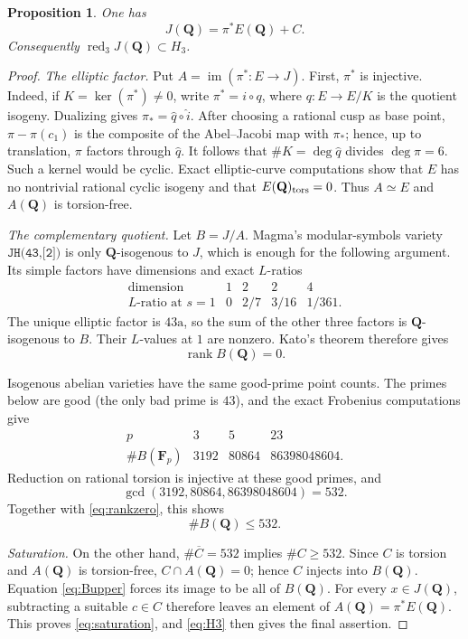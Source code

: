 \documentclass[11pt]{article}
\newcommand{\Q}{\mathbf Q}
\newcommand{\F}{\mathbf F}
\newcommand{\red}{\operatorname{red}}
\newcommand{\code}[1]{\texttt{#1}}
\newtheorem{proposition}[theorem]{Proposition}
\begin{document}
\begin{proposition}\label{prop:saturation}
One has
\[
                       J(\Q)=\pi^*E(\Q)+C.
\tag{2.5}\label{eq:saturation}
\]
Consequently \(\red_3J(\Q)\subset H_3\).
\end{proposition}

\begin{proof}
\noindent\emph{The elliptic factor.}
Put \(A=\operatorname{im}(\pi^*:E\to J)\).  First, \(\pi^*\) is
injective.  Indeed, if \(K=\ker(\pi^*)\neq0\), write
\(\pi^*=i\circ q\), where \(q:E\to E/K\) is the quotient isogeny.
Dualizing gives \(\pi_*=\widehat q\circ\widehat i\).  After choosing a
rational cusp as base point, \(\pi-\pi(c_1)\) is the composite of the
Abel--Jacobi map with \(\pi_*\); hence, up to translation, \(\pi\)
factors through \(\widehat q\).  It follows that
\(\#K=\deg\widehat q\) divides \(\deg\pi=6\).
Such a kernel would be cyclic.  Exact elliptic-curve computations show
that \(E\) has no nontrivial rational cyclic isogeny and that
\(E(\Q)_{\rm tors}=0\).  Thus \(A\simeq E\) and \(A(\Q)\) is
torsion-free.

\smallskip
\noindent\emph{The complementary quotient.}
Let \(B=J/A\).  Magma's modular-symbols variety
\(\code{JH(43,[2])}\) is only \(\Q\)-isogenous to \(J\), which is enough
for the following argument.  Its simple factors have dimensions and
exact \(L\)-ratios
\[
\begin{array}{c|rrrr}
\text{dimension}&1&2&2&4\\ \hline
L\text{-ratio at }s=1&0&2/7&3/16&1/361.
\end{array}
\tag{2.6}\label{eq:Lratios}
\]
The unique elliptic factor is \(43\mathrm a\), so the sum of the other
three factors is \(\Q\)-isogenous to \(B\).  Their \(L\)-values at \(1\)
are nonzero.  Kato's theorem \cite[Corollary 14.3]{Kato} therefore gives
\[
                         \operatorname{rank}B(\Q)=0.
\tag{2.7}\label{eq:rankzero}
\]

Isogenous abelian varieties have the same good-prime point counts.  The
primes below are good (the only bad prime is \(43\)), and the exact
Frobenius computations give
\[
\begin{array}{c|rrr}
p&3&5&23\\ \hline
\#B(\F_p)&3192&80864&86398048604.
\end{array}
\]
Reduction on rational torsion is injective at these good primes, and
\[
             \gcd(3192,80864,86398048604)=532.
\]
Together with \eqref{eq:rankzero}, this shows
\[
                         \#B(\Q)\leq532.
\tag{2.8}\label{eq:Bupper}
\]

\smallskip
\noindent\emph{Saturation.}
On the other hand, \(\#\overline C=532\) implies \(\#C\geq532\).
Since \(C\) is torsion and \(A(\Q)\) is torsion-free,
\(C\cap A(\Q)=0\); hence \(C\) injects into \(B(\Q)\).
Equation \eqref{eq:Bupper} forces its image to be all of \(B(\Q)\).
For every \(x\in J(\Q)\), subtracting a suitable \(c\in C\) therefore
leaves an element of \(A(\Q)=\pi^*E(\Q)\).  This proves
\eqref{eq:saturation}, and \eqref{eq:H3} then gives the final assertion.
\end{proof}
\end{document}
